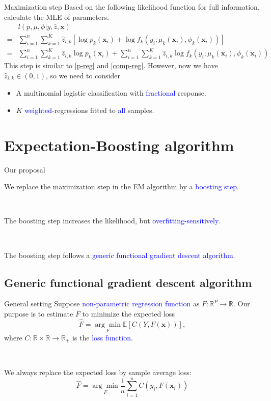 \documentclass[professionalfont]{beamer}
\def\R{{\mathbb R}}  %
\def\E{{\mathbb E}}  %
\def\bx{\boldsymbol{x}}
\newcommand{\blue}[1]{\textcolor{blue}{#1}}
\begin{document}
\begin{frame}{Maximization step}
Based on the following likelihood function for full information, calculate the MLE of parameters.
	\begin{equation}
		\begin{aligned}
			&l(p,\mu,\phi|y,\hat{z},\bx)\\
			=&\sum_{i=1}^n\sum_{k=1}^K \hat{z}_{i,k}\left[\log p_k(\bx_i) + \log f_k(y_i;\mu_k(\bx_i),\phi_k(\bx_i))\right]\\
			=&\sum_{i=1}^n\sum_{k=1}^K \hat{z}_{i,k}\log p_k(\bx_i) + \sum_{i=1}^n\sum_{k=1}^K \hat{z}_{i,k}\log f_k(y_i;\mu_k(\bx_i),\phi_k(\bx_i))
		\end{aligned}
	\end{equation}
This step is similar to \eqref{p-reg} and \eqref{comp-reg}. However, now we have $\hat{z}_{i,k}\in(0,1)$, so we need to consider
\begin{itemize}
	\item A multinomial logistic classification with \blue{fractional} response.
	\item $K$ \blue{weighted}-regressions fitted to \blue{all} samples.
\end{itemize}
\end{frame}

\section{Expectation-Boosting algorithm}

\begin{frame}{Our proposal}

	We replace the maximization step in the EM algorithm by a \blue{boosting step}.

	~

	The boosting step  increases the likelihood, but \blue{overfitting-sensitively}.


	~

	The boosting step follows a \blue{generic functional gradient descent algorithm}.

\end{frame}

\subsection{Generic functional gradient descent algorithm}
\begin{frame}{General setting}
	Suppose \blue{non-parametric regression function} as $F:\R^P\rightarrow\R$. Our purpose is to  estimate $F$ to minimize the expected loss $$\hat{F}=\underset{F}{\arg\min}\E\left[C(Y,F(\bx))\right],$$
	where $C:\R\times\R\rightarrow\R_+$ is the \blue{loss function}.

	~

	We always replace the expected loss by sample average loss:
	$$\hat{F}=\underset{F}{\arg\min} \frac{1}{n}\sum_{i=1}^nC(y_i,F(\bx_i))$$
\end{frame}
\end{document}

